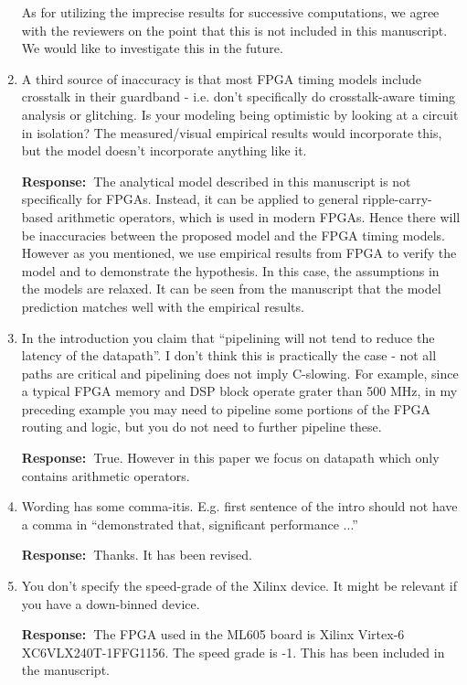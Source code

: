 \documentclass[a4paper, 11pt]{article}
\def\Response{\noindent \textbf{Response:~}}
\newcommand{\Question}[1]{\textcolor[rgb]{0.51,0.00,0.00}{#1}}
\begin{document}
\begin{enumerate}
      As for utilizing the imprecise results for successive computations, we agree with the reviewers on the point that this is not included in this manuscript. We would like to investigate this in the future. 
      
      
  \item \Question{A third source of inaccuracy is that most FPGA timing models include crosstalk in their guardband - i.e. don't specifically do crosstalk-aware timing analysis or glitching.  Is your modeling being optimistic by looking at a circuit in isolation?  The measured/visual empirical results would incorporate this, but the model doesn't incorporate anything like it.}
      
      \Response The analytical model described in this manuscript is not specifically for FPGAs. Instead, it can be applied to general ripple-carry-based arithmetic operators, which is used in modern FPGAs. Hence there will be inaccuracies between the proposed model and the FPGA timing models. However as you mentioned, we use empirical results from FPGA to verify the model and to demonstrate the hypothesis. In this case, the assumptions in the models are relaxed. It can be seen from the manuscript that the model prediction matches well with the empirical results.

  \item \Question{In the introduction you claim that ``pipelining will not tend to reduce the latency of the datapath''. I don't think this is practically the case - not all paths are critical and pipelining does not imply C-slowing. For example, since a typical FPGA memory and DSP block operate grater than 500 MHz, in my preceding example you may need to pipeline some portions of the FPGA routing and logic, but you do not need to further pipeline these.}
      
      \Response True. However in this paper we focus on datapath which only contains arithmetic operators.
  
  \item \Question{Wording has some comma-itis. E.g. first sentence of the intro should not have a comma in ``demonstrated that, significant performance ...''}
      
      \Response Thanks. It has been revised.
      
  \item \Question{You don't specify the speed-grade of the Xilinx device. It might be relevant if you have a down-binned device.}
      
      \Response The FPGA used in the ML605 board is Xilinx Virtex-6 XC6VLX240T-1FFG1156. The speed grade is -1. This has been included in the manuscript.
\end{enumerate}
\end{document}
